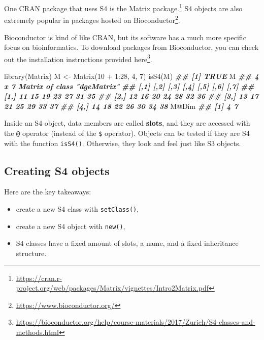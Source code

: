 \documentclass[
  12pt,
  krantz2]{krantz}
\makeatletter
\newenvironment{Shaded}{\begin{snugshade}}{\end{snugshade}}
\newcommand{\DecValTok}[1]{\textcolor[rgb]{0.06,0.06,0.06}{#1}}
\newcommand{\DocumentationTok}[1]{\textcolor[rgb]{0.37,0.37,0.37}{\textbf{\textit{#1}}}}
\newcommand{\FunctionTok}[1]{\textcolor[rgb]{0,0,0}{#1}}
\newcommand{\NormalTok}[1]{#1}
\newcommand{\OtherTok}[1]{\textcolor[rgb]{0.37,0.37,0.37}{#1}}
\newcommand{\SpecialCharTok}[1]{\textcolor[rgb]{0,0,0}{#1}}
\providecommand{\tightlist}{%
  \setlength{\itemsep}{0pt}\setlength{\parskip}{0pt}}
\renewcommand{\href}[2]{#2\footnote{\url{#1}}}
\newenvironment{kframe}{%
\medskip{}
\setlength{\fboxsep}{.8em}
 \def\at@end@of@kframe{}%
 \ifinner\ifhmode%
  \def\at@end@of@kframe{\end{minipage}}%
  \begin{minipage}{\columnwidth}%
 \fi\fi%
 \def\FrameCommand##1{\hskip\@totalleftmargin \hskip-\fboxsep
 \colorbox{shadecolor}{##1}\hskip-\fboxsep
     \hskip-\linewidth \hskip-\@totalleftmargin \hskip\columnwidth}%
 \MakeFramed {\advance\hsize-\width
   \@totalleftmargin\z@ \linewidth\hsize
   \@setminipage}}%
 {\par\unskip\endMakeFramed%
 \at@end@of@kframe}
\renewenvironment{Shaded}{\begin{kframe}}{\end{kframe}}
\makeatother
\begin{document}
One CRAN package that uses S4 is the \href{https://cran.r-project.org/web/packages/Matrix/vignettes/Intro2Matrix.pdf}{Matrix package.} S4 objects are also extremely popular in packages hosted on \href{https://www.bioconductor.org/}{Bioconductor}.

Bioconductor is kind of like CRAN, but its software has a much more specific focus on bioinformatics. To download packages from Bioconductor, you can check out the installation instructions provided \href{https://bioconductor.org/help/course-materials/2017/Zurich/S4-classes-and-methods.html}{here}.

\begin{Shaded}
\begin{Highlighting}[]
\FunctionTok{library}\NormalTok{(Matrix)}
\NormalTok{M }\OtherTok{\textless{}{-}} \FunctionTok{Matrix}\NormalTok{(}\DecValTok{10} \SpecialCharTok{+} \DecValTok{1}\SpecialCharTok{:}\DecValTok{28}\NormalTok{, }\DecValTok{4}\NormalTok{, }\DecValTok{7}\NormalTok{)}
\FunctionTok{isS4}\NormalTok{(M)}
\DocumentationTok{\#\# [1] TRUE}
\NormalTok{M}
\DocumentationTok{\#\# 4 x 7 Matrix of class "dgeMatrix"}
\DocumentationTok{\#\#      [,1] [,2] [,3] [,4] [,5] [,6] [,7]}
\DocumentationTok{\#\# [1,]   11   15   19   23   27   31   35}
\DocumentationTok{\#\# [2,]   12   16   20   24   28   32   36}
\DocumentationTok{\#\# [3,]   13   17   21   25   29   33   37}
\DocumentationTok{\#\# [4,]   14   18   22   26   30   34   38}
\NormalTok{M}\SpecialCharTok{@}\NormalTok{Dim}
\DocumentationTok{\#\# [1] 4 7}
\end{Highlighting}
\end{Shaded}

Inside an S4 object, data members are called \textbf{slots}, and they are accessed with the \texttt{@} operator (instead of the \texttt{\$} operator). Objects can be tested if they are S4 with the function \texttt{isS4()}. Otherwise, they look and feel just like S3 objects.

\hypertarget{creating-s4-objects}{%
\subsection{Creating S4 objects}\label{creating-s4-objects}}

Here are the key takeaways:

\begin{itemize}
\tightlist
\item
  create a new S4 class with \texttt{setClass()},
\item
  create a new S4 object with \texttt{new()},
\item
  S4 classes have a fixed amount of slots, a name, and a fixed inheritance structure.
\end{itemize}
\end{document}
